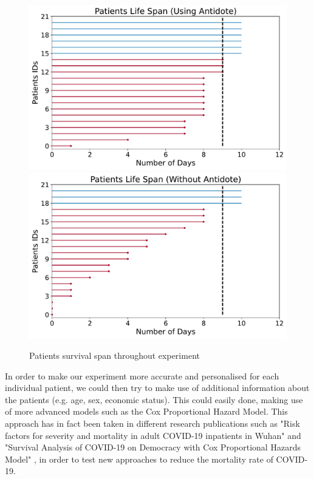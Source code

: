 \begin{figure}[ht!]%
    \centering
    \includegraphics[width=0.5\linewidth]{latex/images/survival_span.pdf}
    \includegraphics[width=0.49\linewidth]{latex/images/survival_span2.pdf}
    \vspace{-0.2cm}
    \caption{Patients survival span throughout experiment}
    \label{span}
\end{figure}

In order to make our experiment more accurate and personalised for each individual patient, we could then try to make use of additional information about the patients (e.g. age, sex, economic status). This could easily done, making use of more advanced models such as the Cox Proportional Hazard Model. This approach has in fact been taken in different research publications such as "Risk factors for severity and mortality in adult COVID-19 inpatients in Wuhan" \cite{surv1} and "Survival Analysis of COVID-19 on Democracy with Cox Proportional Hazards Model" \cite{surv2}, in order to test new approaches to reduce the mortality rate of COVID-19. 